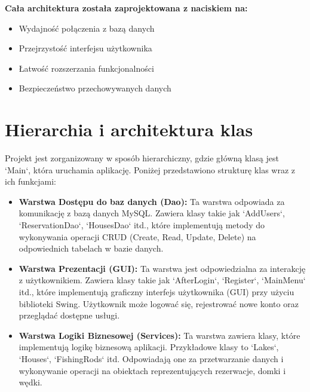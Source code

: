 \textbf{Cała architektura została zaprojektowana z naciskiem na:}

\begin{itemize}

\item Wydajność połączenia z bazą danych

\item Przejrzystość interfejsu użytkownika

\item Łatwość rozszerzania funkcjonalności

\item Bezpieczeństwo przechowywanych danych\\

\end{itemize}



\section{Hierarchia i architektura klas}

Projekt jest zorganizowany w sposób hierarchiczny, gdzie główną klasą jest `Main`, która uruchamia aplikację. Poniżej przedstawiono strukturę klas wraz z ich funkcjami:

\begin{itemize}
    \item \textbf{Warstwa Dostępu do baz danych (Dao):} Ta warstwa odpowiada za komunikację z bazą danych MySQL. Zawiera klasy takie jak `AddUsers`, `ReservationDao`, `HousesDao` itd., które implementują metody do wykonywania operacji CRUD (Create, Read, Update, Delete) na odpowiednich tabelach w bazie danych.
    \item \textbf{Warstwa Prezentacji (GUI):} Ta warstwa jest odpowiedzialna za interakcję z użytkownikiem. Zawiera klasy takie jak `AfterLogin`, `Register`, `MainMenu` itd., które implementują graficzny interfejs użytkownika (GUI) przy użyciu biblioteki Swing. Użytkownik może logować się, rejestrować nowe konto oraz przeglądać dostępne usługi.
    \item \textbf{Warstwa Logiki Biznesowej (Services):} Ta warstwa zawiera klasy, które implementują logikę biznesową aplikacji. Przykładowe klasy to `Lakes`, `Houses`, `FishingRods` itd. Odpowiadają one za przetwarzanie danych i wykonywanie operacji na obiektach reprezentujących rezerwacje, domki i wędki.

\end{itemize}
\clearpage

